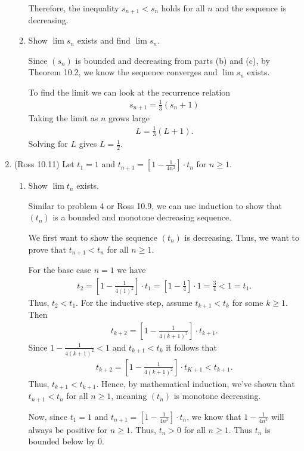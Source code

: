 \documentclass [10pt]{article}
\newcommand{\jg}[1]{{\color{blue} #1}}
\begin{document}
\begin{enumerate}
\begin{enumerate}
{Therefore, the inequality $s_{n+1} < s_n $ holds for all $n$ and the sequence is decreasing. 
}
\item Show $\lim s_n$ exists and find $\lim s_n$.

\jg{ 
Since $(s_n)$ is bounded and decreasing from parts (b) and (c), by Theorem 10.2, we know the sequence converges and $\lim s_n$ exists. 

To find the limit we can look at the recurrence relation
\begin{align*}
    s_{n+1} = \frac{1}{3} (s_n+1) 
\end{align*}
Taking the limit as $n$ grows large
\begin{align*}
    L = \frac{1}{3} (L+1). 
\end{align*}
Solving for $L$ gives $L = \frac{1}{2}$. 
}

\end{enumerate}
\clearpage

\item (Ross 10.11) Let $t_1 = 1$ and $t_{n+1} = [1 - \frac{1}{4n^2} ] \cdot t_n$
for $n \geq 1$.
\begin{enumerate}
\item Show $\lim t_n$ exists.

\jg{
Similar to problem 4 or Ross 10.9, we can use induction to show that $(t_n)$ is a bounded and monotone decreasing sequence. 

We first want to show the sequence $(t_n)$ is decreasing. Thus, we want to prove that $t_{n+1} < t_n$ for all $n \geq 1$. 

For the base case $n=1$ we have 
\begin{align*}
    t_2 = \left[ 1 - \frac{1}{4(1)^2}\right] \cdot t_1 = \left[ 1 - \frac{1}{4}\right] \cdot 1 = \frac{3}{4} < 1 = t_1. 
\end{align*}
Thus, $t_2 < t_1$. 
For the inductive step, assume $t_{k+1} < t_k$ for some $k \geq 1$. Then
\begin{align*}
    t_{k+2} = \left[ 1 - \frac{1}{4(k+1)^2}\right] \cdot t_{k+1}. 
\end{align*}
Since $1 - \frac{1}{4(k+1)^2} < 1$ and $t_{k+1} < t_k$ it follows that
\begin{align*}
    t_{k+2} = \left[ 1 - \frac{1}{4(k+1)^2} \right] \cdot t_{K+1} < t_{k+1}. 
\end{align*}
Thus, $t_{k+1} < t_{k+1}$. Hence, by mathematical induction, we've shown that $t_{n+1} < t_n$ for all $n \geq 1$, meaning $(t_n)$ is monotone decreasing. 

Now, since $t_1 = 1$ and $t_{n+1} = [1 - \frac{1}{4n^2}] \cdot t_n$, we know that $1 - \frac{1}{4n^2}$ will always be positive for $n \geq 1$. Thus, $t_n > 0$ for all $n \geq 1$. Thus $t_n$ is bounded below by 0. 

}
\end{enumerate}
\end{enumerate}
\end{document}
